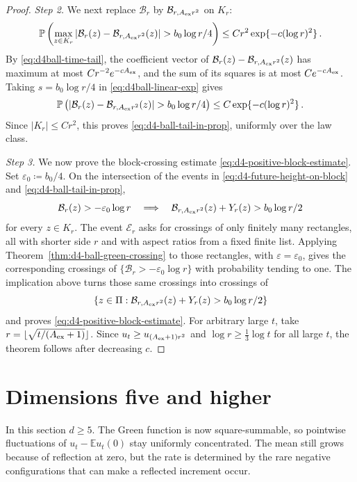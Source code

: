 \documentclass[11pt]{amsart}
\theoremstyle{plain}
\theoremstyle{definition}
\newcommand{\E}{\mathbb{E}}
\renewcommand{\P}{\mathbb{P}}
\begin{document}
\begin{proof}
\smallskip
\noindent\emph{Step 2.} We next replace $\mathcal B_r$ by
$\mathcal B_{r,A_{\rm ex}r^2}$ on $K_r$:
\begin{equation}\label{eq:d4-ball-tail-in-prop}
    \P\left(
    \max_{z\in K_r}|\mathcal B_r(z)-\mathcal B_{r,A_{\rm ex}r^2}(z)|
    >b_0\log r/4
    \right)
    \leq Cr^2\exp\{-c(\log r)^2\}\, .
\end{equation}
By \eqref{eq:d4ball-time-tail}, the coefficient vector of
$\mathcal B_r(z)-\mathcal B_{r,A_{\rm ex}r^2}(z)$ has maximum at most
$Cr^{-2}e^{-cA_{\rm ex}}$, and the sum of its squares is at most
$Ce^{-cA_{\rm ex}}$.
Taking $s=b_0\log r/4$ in \eqref{eq:d4ball-linear-exp} gives
\[
    \P\left(
    |\mathcal B_r(z)-\mathcal B_{r,A_{\rm ex}r^2}(z)|>b_0\log r/4
    \right)
    \leq C\exp\{-c(\log r)^2\}\, .
\]
Since $|K_r|\leq Cr^2$, this proves \eqref{eq:d4-ball-tail-in-prop}, uniformly
over the law class.

\smallskip
\noindent\emph{Step 3.} We now prove the block-crossing estimate
\eqref{eq:d4-positive-block-estimate}. Set $\varepsilon_0\coloneqq b_0/4$. On the intersection of the events in
\eqref{eq:d4-future-height-on-block} and \eqref{eq:d4-ball-tail-in-prop},
\[
    \mathcal B_r(z)>-\varepsilon_0\log r
    \quad\Longrightarrow\quad
    \mathcal B_{r,A_{\rm ex}r^2}(z)+Y_r(z)>b_0\log r/2
\]
for every $z\in K_r$. The event $\mathcal E_r$ asks for crossings of only
finitely many rectangles, all with shorter side $r$ and with aspect ratios from
a fixed finite list. Applying Theorem~\ref{thm:d4-ball-green-crossing} to
those rectangles, with $\varepsilon=\varepsilon_0$, gives the corresponding
crossings of $\{\mathcal B_r>-\varepsilon_0\log r\}$ with probability tending
to one. The implication above turns those same crossings into crossings of
\[
    \{z\in\Pi:\mathcal B_{r,A_{\rm ex}r^2}(z)+Y_r(z)>b_0\log r/2\}
\]
and proves \eqref{eq:d4-positive-block-estimate}. For arbitrary large $t$, take
$r=\lfloor\sqrt{t/(A_{\rm ex}+1)}\rfloor$. Since
$u_t\geq u_{(A_{\rm ex}+1)r^2}$ and $\log r\geq\frac13\log t$ for all large
$t$, the theorem follows after decreasing $c$.
\end{proof}

	\section{Dimensions five and higher}\label{sec:dim5plus}

In this section $d\geq5$. The Green function is now square-summable, so
pointwise fluctuations of $u_t-\E u_t(0)$ stay uniformly concentrated. The
mean still grows because of reflection at zero, but the rate is determined by
the rare negative configurations that can make a reflected increment occur.
\end{document}
